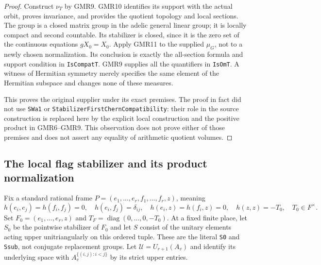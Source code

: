 \documentclass[11pt,a4paper]{article}
\numberwithin{equation}{section}
\theoremstyle{remark}\newtheorem{remark}[theorem]{Remark}
\begin{document}
\begin{proof}
Construct $\nu_T$ by GMR9.  GMR10 identifies its support with the
actual orbit, proves invariance, and provides the quotient topology
and local sections.  The group is a closed matrix group in the
adelic general linear group; it is locally compact and second
countable.  Its stabilizer is closed, since it is the zero set of
the continuous equations $gX_0=X_0$.  Apply GMR11 to the supplied
$\mu_G$, not to a newly chosen normalization.  Its conclusion is
exactly the all-section formula and support condition in
\texttt{Is\allowbreak Compat\allowbreak T}.  GMR9 supplies all the quantifiers in
\texttt{Is\allowbreak Om\allowbreak T}.  A witness of Hermitian symmetry merely specifies
the same element of the Hermitian subspace and changes none of these
measures.

This proves the original supplier under its exact premises.
The proof in fact did not use \texttt{SWa1} or
\texttt{Stabilizer\allowbreak First\allowbreak Chern\allowbreak Compatibility}: their role in the source
construction is replaced here by the explicit local construction and
the positive product in GMR6--GMR9.  This observation does not prove
either of those premises and does not assert any equality of
arithmetic quotient volumes.
\end{proof}

\subsection{The local flag stabilizer and its product normalization}

Fix a standard rational frame
$P=(e_1,\ldots,e_r,f_1,\ldots,f_r,z)$, meaning
\[
 h(e_i,e_j)=h(f_i,f_j)=0,\quad h(e_i,f_j)=\delta_{ij},\quad
 h(e_i,z)=h(f_i,z)=0,\quad h(z,z)=-T_0,\quad T_0\in F^\times.
 \tag{GMR.21}
\]
Set $F_0=(e_1,\ldots,e_r,z)$ and
$T_F=\operatorname{diag}(0,\ldots,0,-T_0)$.
At a fixed finite place, let $S_0$ be the pointwise stabilizer of $F_0$
and let $S$ consist of the unitary elements acting upper
unitriangularly on this ordered tuple.  These are the literal
\texttt{S0} and \texttt{Ssub}, not conjugate replacement groups.
Let $\mathcal U=U_{r+1}(A_v)$ and identify its underlying space with
$A_v^{\{(i,j):i<j\}}$ by its strict upper entries.

\end{document}
